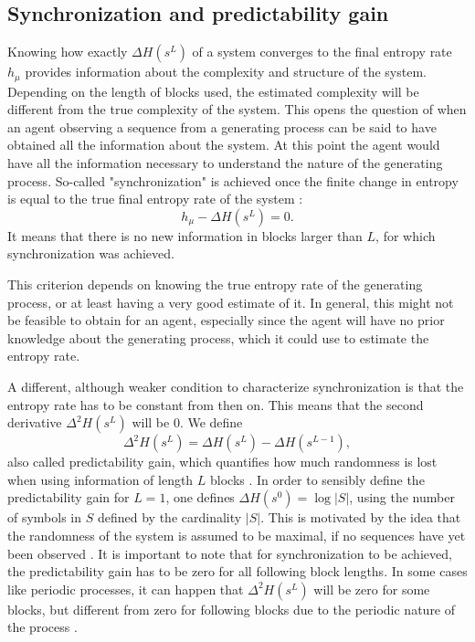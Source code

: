 \documentclass[12pt,a4paper]{article}
\begin{document}
\subsection{Synchronization and predictability gain} \label{ssec:synch_predgain}
Knowing how exactly $\Delta H(s^L)$ of a system converges to the final entropy rate $h_\mu$ provides information about the complexity and structure of the system.
Depending on the length of blocks used, the estimated complexity will be different from the true complexity of the system.
This opens the question of when an agent observing a sequence from a generating process can be said to have obtained all the information about the system.
At this point the agent would have all the information necessary to understand the nature of the generating process.
So-called "synchronization" is achieved once the finite change in entropy is equal to the true final entropy rate of the system \autocite{crutchfield2003regularities}:
\begin{equation}
    \label{eq:synchronisation_equality}
    h_\mu - \Delta H(s^L) = 0.
\end{equation}
It means that there is no new information in blocks larger than $L$, for which synchronization was achieved.

This criterion depends on knowing the true entropy rate of the generating process, or at least having a very good estimate of it.
In general, this might not be feasible to obtain for an agent, especially since the agent will have no prior knowledge about the generating process, which it could use to estimate the entropy rate.

A different, although weaker condition to characterize synchronization is that the entropy rate has to be constant from then on.
This means that the second derivative $\Delta^2 H(s^L)$ will be 0.
We define
\begin{equation}
    \label{eq:predictability_gain}
    \Delta^2 H(s^L) = \Delta H(s^L) - \Delta H(s^{L-1}),
\end{equation}
also called predictability gain, which quantifies how much randomness is lost when using information of length $L$ blocks \autocite{crutchfield2003regularities}.
In order to sensibly define the predictability gain for $L=1$, one defines $\Delta H(s^0) = \log |S|$, using the number of symbols in $S$ defined by the cardinality $|S|$.
This is motivated by the idea that the randomness of the system is assumed to be maximal, if no sequences have yet been observed \autocite{crutchfield2003regularities}.
It is important to note that for synchronization to be achieved, the predictability gain has to be zero for all following block lengths.
In some cases like periodic processes, it can happen that $\Delta^2 H(s^L)$ will be zero for some blocks, but different from zero for following blocks due to the periodic nature of the process \autocite{crutchfield2003regularities}.
\end{document}
